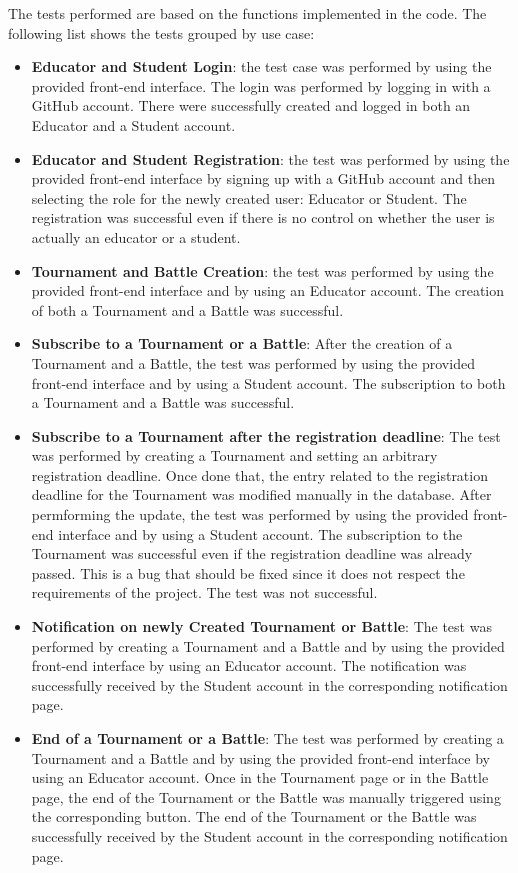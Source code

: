 The tests performed are based on the functions implemented in the code.
The following list shows the tests grouped by use case:
\begin{itemize}
    \item \textbf{Educator and Student Login}: the test case was performed by using the provided front-end interface. The login was performed by logging in with a GitHub account. There were successfully created and logged in both an Educator and a Student account.
    \item \textbf{Educator and Student Registration}: the test was performed by using the provided front-end interface by signing up with a GitHub account and then selecting the role for the newly created user: Educator or Student. The registration was successful even if there is no control on whether the user is actually an educator or a student.
    \item \textbf{Tournament and Battle Creation}: the test was performed by using the provided front-end interface and by using an Educator account. The creation of both a Tournament and a Battle was successful.
    \item \textbf{Subscribe to a Tournament or a Battle}: After the creation of a Tournament and a Battle, the test was performed by using the provided front-end interface and by using a Student account. The subscription to both a Tournament and a Battle was successful.
    \item \textbf{Subscribe to a Tournament after the registration deadline}: The test was performed by creating a Tournament and setting an arbitrary registration deadline. Once done that, the entry related to the registration deadline for the Tournament was modified manually in the database. After permforming the update, the test was performed by using the provided front-end interface and by using a Student account. The subscription to the Tournament was successful even if the registration deadline was already passed. This is a bug that should be fixed since it does not respect the requirements of the project. The test was not successful.
    \item \textbf{Notification on newly Created Tournament or Battle}: The test was performed by creating a Tournament and a Battle and by using the provided front-end interface by using an Educator account. The notification was successfully received by the Student account in the corresponding notification page.
    \item \textbf{End of a Tournament or a Battle}: The test was performed by creating a Tournament and a Battle and by using the provided front-end interface by using an Educator account. Once in the Tournament page or in the Battle page, the end of the Tournament or the Battle was manually triggered using the corresponding button. The end of the Tournament or the Battle was successfully received by the Student account in the corresponding notification page.

\end{itemize}
